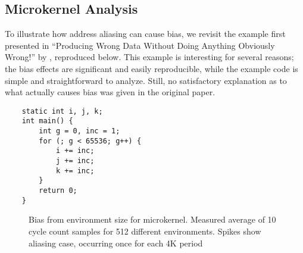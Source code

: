 \documentclass[prodmode,acmtaco]{acmsmall}
\begin{document}
\subsection{Microkernel Analysis}
To illustrate how address aliasing can cause bias, we revisit the example first presented in ``Producing Wrong Data Without Doing Anything Obviously Wrong!'' by , reproduced below. 
This example is interesting for several reasons; the bias effects are significant and easily reproducible, while the example code is simple and straightforward to analyze.
Still, no satisfactory explanation as to what actually causes bias was given in the original paper.

  \begin{lstlisting}
    static int i, j, k;
    int main() {
        int g = 0, inc = 1;
        for (; g < 65536; g++) {
            i += inc;
            j += inc;
            k += inc; 
        }
        return 0;
    }
  \end{lstlisting}


\begin{figure*}[t]
  \caption{Bias from environment size for microkernel. Measured average of 10 cycle count samples for 512 different environments. Spikes show aliasing case, occurring once for each 4K period}
  \label{fig:envbias}
\end{figure*}
\end{document}
